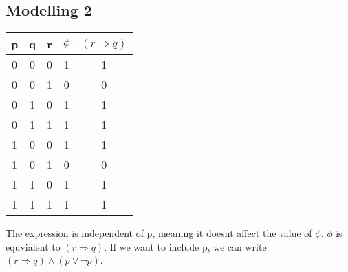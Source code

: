 \subsection{Modelling 2}
\begin{large}
  \begin{tabular}{c|c|c||c||c}
    p & q & r & $ \phi$ & $ (r \Rightarrow q) $ \\
    \hline\hline
    0 & 0 & 0 & 1       & 1                     \\
    \hline
    0 & 0 & 1 & 0       & 0                     \\
    \hline
    0 & 1 & 0 & 1       & 1                     \\
    \hline
    0 & 1 & 1 & 1       & 1                     \\
    \hline
    1 & 0 & 0 & 1       & 1                     \\
    \hline
    1 & 0 & 1 & 0       & 0                     \\
    \hline
    1 & 1 & 0 & 1       & 1                     \\
    \hline
    1 & 1 & 1 & 1       & 1                     \\
    \hline
  \end{tabular}

  The expression is independent of p, meaning it doesnt affect the value of $\phi$. $\phi$ is equvialent to $(r \Rightarrow q)$. If we want to include p, we can write $ (r \Rightarrow q)  \land (p \lor \neg p) $.
\end{large}
